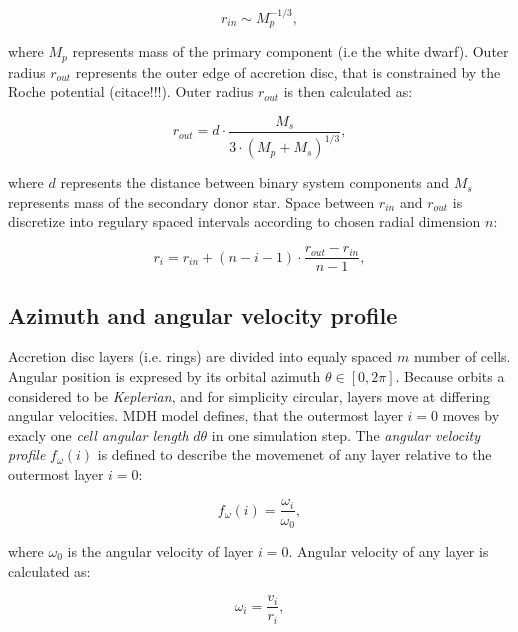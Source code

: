 \begin{equation}
    r_{in} \sim M_p^{-1/3},
\end{equation}

where $M_p$ represents mass of the primary component (i.e the white dwarf). Outer radius $r_{out}$ represents the outer edge of accretion disc, that is constrained by the Roche potential (citace!!!). Outer radius $r_{out}$ is then calculated as:

\begin{equation}
    r_{out} = d \cdot \frac{M_{s}}{3 \cdot (M_p+M_{s})^{1/3}},
\end{equation}

where $d$ represents the distance between binary system components and $M_s$ represents mass of the secondary donor star. Space between $r_{in}$ and $r_{out}$ is discretize into regulary spaced intervals according to chosen radial dimension $n$:

\begin{equation} \label{eq:cell_radius}
    r_i = r_{in} + (n - i - 1) \cdot \frac{r_{out} - r_{in}}{n - 1},
\end{equation}

\subsection{Azimuth and angular velocity profile}
Accretion disc layers (i.e. rings) are divided into equaly spaced $m$ number of cells. Angular position is expresed by its orbital azimuth $\theta \in [0, 2\pi]$. Because orbits a considered to be \emph{Keplerian}, and for simplicity circular, layers move at differing angular velocities. MDH model defines, that the outermost layer $i = 0$ moves by exacly one \emph{cell angular length} $d\theta$ in one simulation step. The \emph{angular velocity profile} $f_{\omega}(i)$ is defined to describe the movemenet of any layer relative to the outermost layer $i=0$: 

\begin{equation}
f_{\omega}(i) = \frac{\omega_i}{\omega_0},
\end{equation}

where $\omega_0$ is the angular velocity of layer $i=0$. Angular velocity of any layer is calculated as: 

\begin{equation}
\omega_i = \frac{v_i}{r_i},
\end{equation}

\newpage

